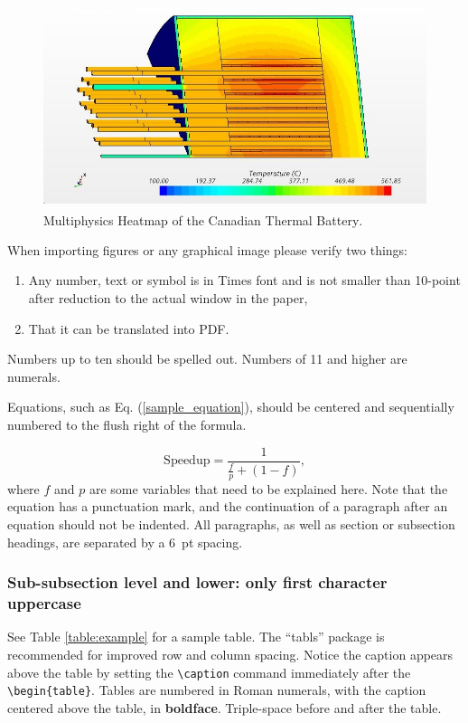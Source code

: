 \documentclass[letterpaper]{mc2023}
\begin{document}
\begin{figure}[!htb]
  \centering
  \includegraphics[scale=0.46]{CNBHeatMap.jpg}
  \caption{Multiphysics Heatmap of the Canadian Thermal Battery\textsuperscript{\texttrademark}. }
  \label{fig:mcd}
\end{figure}

When importing figures or any graphical image please verify two things:
\begin{enumerate} 
\item Any number, text or symbol is in Times font and is not smaller than 
  10-point after reduction to the actual window in the paper,
\item That it can be translated into PDF.
\end{enumerate}

Numbers up to ten should be spelled out. Numbers of 11 and higher are numerals.

Equations, such as Eq. (\ref{sample_equation}), should be centered and 
sequentially numbered to the flush right of the formula.

\begin{equation}
  \label{sample_equation}
  \mathrm{Speedup}=\frac{1}{\frac{f}{p}+(1-f)},
\end{equation}
where $f$ and $p$ are some variables that need to be explained here.  Note that the equation has a punctuation mark, and the continuation of a paragraph after an equation should not be indented.  
All paragraphs, as well as section or subsection headings, are separated by a 6~pt spacing.

\subsubsection{Sub-subsection level and lower: only first character uppercase}

See Table \ref{table:example} for a sample table.  The ``tabls'' package is
recommended for improved row and column spacing.  Notice the caption appears 
above the table by setting the \verb!\caption! command immediately 
after the \verb!\begin{table}!. Tables are numbered in Roman 
numerals, with the caption centered above the table, in \textbf{boldface}.  
Triple-space before and after the table.
\end{document}
